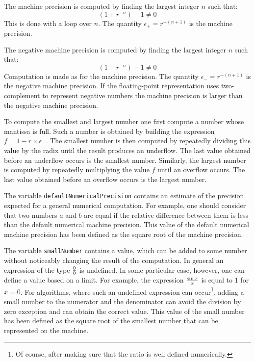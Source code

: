 \documentclass[twoside]{book}
\begin{document}
The machine precision is computed by finding the largest integer
$n$ such that:
\begin{equation}
\left(1+r^{-n}\right)-1\ne 0
\end{equation}
This is done with a loop over $n$. The quantity
$\epsilon_+=r^{-\left(n+1\right)}$ is the machine precision.

The negative machine precision is computed by finding the largest
integer $n$ such that:
\begin{equation}
\left(1-r^{-n}\right)-1\ne 0
\end{equation}
Computation is made as for the machine precision. The quantity
$\epsilon_-=r^{-\left(n+1\right)}$ is the negative machine
precision. If the floating-point representation uses
two-complement to represent negative numbers the machine precision
is larger than the negative machine precision.

To compute the smallest and largest number one first compute a
number whose mantissa is full. Such a number is obtained by
building the expression $f=1-r \times \epsilon_-$. The smallest
number is then computed by repeatedly dividing this value by the
radix until the result produces an underflow. The last value
obtained before an underflow occurs is the smallest number.
Similarly, the largest number is computed by repeatedly
multiplying the value $f$ until an overflow occurs. The last value
obtained before an overflow occurs is the largest number.

The variable {\tt defaultNumericalPrecision} contains an estimate
of the precision expected for a general numerical computation. For
example, one should consider that two numbers $a$ and $b$ are
equal if the relative difference between them is less than the
default numerical machine precision. This value of the default
numerical machine precision has been defined as the square root of
the machine precision.

The variable {\tt smallNumber} contains a value, which can be
added to some number without noticeably changing the result of the
computation. In general an expression of the type $0 \over 0$ is
undefined. In some particular case, however, one can define a
value based on a limit. For example, the expression $\sin x \over
x $ is equal to 1 for $x=0$. For algorithms, where such an
undefined expression can occur\footnote{Of course, after making
sure that the ratio is well defined numerically.}, adding a small
number to the numerator and the denominator can avoid the division
by zero exception and can obtain the correct value. This value of
the small number has been defined as the square root of the
smallest number that can be represented on the machine.
\end{document}
